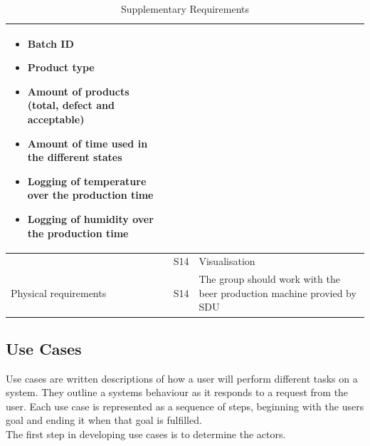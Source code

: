 \begin{table}[H]
\begin{tabularx}{\textwidth}{|>{\RaggedRight}p{5.25cm}|>{\RaggedRight}p{0.6cm}|>{\RaggedRight}X|}
            \begin{itemize}
                \item Batch ID
                \item Product type
                \item Amount of products (total, defect and acceptable)
                \item Amount of time used in the different states
                \item Logging of temperature over the production time
                \item Logging of humidity over the production time
            \end{itemize} \\
        \cline{2-3}
            & S14 & Visualisation \\
        \hline
        Physical requirements & S14 & The group should work with the beer 
        production machine provied by SDU \\
        \hline
    \end{tabularx}
    \caption{Supplementary Requirements} 
    \label{table:sup_requirements}
\end{table} 

\subsection{Use Cases}
Use cases are written descriptions of how a user will perform different tasks
on a system. They outline a systems behaviour as it responds to a request from
the user. Each use case is represented as a sequence of steps, beginning with
the users goal and ending it when that goal is fulfilled. \\

The first step in developing use cases is to determine the actors.


